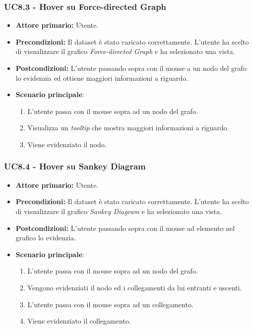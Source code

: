 \subsubsection{UC8.3 - Hover su Force-directed Graph}
\label{sec:UC8.3}
\begin{itemize}
    \item \textbf{Attore primario:} Utente.
    \item \textbf{Precondizioni:} Il dataset è stato caricato correttamente. L'utente ha scelto di visualizzare il grafico \textit{Force-directed Graph} e ha selezionato una vista.
    \item \textbf{Postcondizioni:} L'utente passando sopra con il mouse a un nodo del grafo lo evidenzia ed ottiene maggiori informazioni a riguardo.
    \item \textbf{Scenario principale}:
    \begin{enumerate}
		\item L'utente passa con il mouse sopra ad un nodo del grafo.
		\item Visualizza un \textit{tooltip} che mostra maggiori informazioni a riguardo.
		\item Viene evidenziato il nodo.
	\end{enumerate}
\end{itemize}

\subsubsection{UC8.4 - Hover su Sankey Diagram}
\label{sec:UC8.4}
\begin{itemize}
    \item \textbf{Attore primario:} Utente.
    \item \textbf{Precondizioni:} Il dataset è stato caricato correttamente. L'utente ha scelto di visualizzare il grafico \textit{Sankey Diagram} e ha selezionato una vista.
    \item \textbf{Postcondizioni:} L'utente passando sopra con il mouse ad elemento nel grafico lo evidenzia.
    \item \textbf{Scenario principale}: 
    \begin{enumerate}
		\item L'utente passa con il mouse sopra ad un nodo del grafo.
		\item Vengono evidenziati il nodo ed i collegamenti da lui entranti e uscenti.
		\item L'utente passa con il mouse sopra ad un collegamento.
		\item Viene evidenziato il collegamento.
	\end{enumerate}
\end{itemize}


